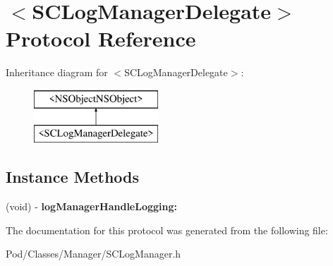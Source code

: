 \hypertarget{protocol_s_c_log_manager_delegate-p}{}\section{$<$S\+C\+Log\+Manager\+Delegate$>$ Protocol Reference}
\label{protocol_s_c_log_manager_delegate-p}
Inheritance diagram for $<$S\+C\+Log\+Manager\+Delegate$>$\+:\begin{figure}[H]
\begin{center}
\leavevmode
\includegraphics[height=2.000000cm]{protocol_s_c_log_manager_delegate-p}
\end{center}
\end{figure}
\subsection*{Instance Methods}
\begin{DoxyCompactItemize}
\item 
(void) -\/ {\bfseries log\+Manager\+Handle\+Logging\+:}\hypertarget{protocol_s_c_log_manager_delegate-p_ac69778fcb289006dd55ce4f8e50d933e}{}\label{protocol_s_c_log_manager_delegate-p_ac69778fcb289006dd55ce4f8e50d933e}

\end{DoxyCompactItemize}


The documentation for this protocol was generated from the following file\+:\begin{DoxyCompactItemize}
\item 
Pod/\+Classes/\+Manager/S\+C\+Log\+Manager.\+h\end{DoxyCompactItemize}
